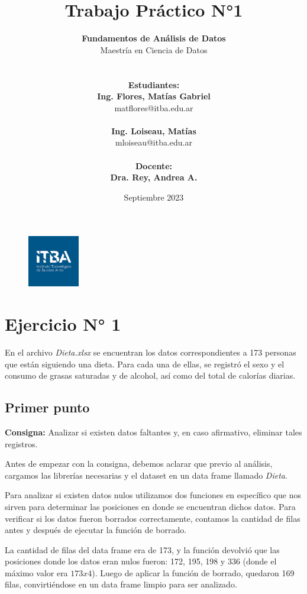 \documentclass{article} %
\title{Trabajo Práctico N°1} %
\date{Septiembre 2023} %
\author{
	\textbf{Fundamentos de Análisis de Datos}\\
	Maestría en Ciencia de Datos\\
	\\~\\
	\textbf{Estudiantes: }\\
	\textbf{Ing. Flores, Matías Gabriel}\\
	matflores@itba.edu.ar
 	\\~\\
 	\textbf{Ing. Loiseau, Matías}\\
 	mloiseau@itba.edu.ar
 	\\~\\
	\textbf{Docente: }\\
	\textbf{Dra. Rey, Andrea A.}
}
\begin{document}

\begin{figure}
\centering
	\includegraphics[width=0.2\textwidth]{images/itba-logo}
	\label{fig:itba-logo}
\end{figure}
\maketitle %

\thispagestyle{empty} %
\cleardoublepage

\cleardoublepage
\tableofcontents %
\cleardoublepage


\section{Ejercicio N° 1}

En el archivo \textit{Dieta.xlsx} se encuentran los datos correspondientes a 173 personas que están siguiendo una dieta. Para cada una de ellas, se registró el sexo y el consumo de grasas saturadas y de alcohol, así como del total de calorías diarias.

\subsection{Primer punto}

\textbf{Consigna:} Analizar si existen datos faltantes y, en caso afirmativo, eliminar tales registros.

Antes de empezar con la consigna, debemos aclarar que previo al análisis, cargamos las librerías necesarias y el dataset en un data frame llamado \textit{Dieta}.

Para analizar si existen datos nulos utilizamos dos funciones en específico 	que nos sirven para determinar las posiciones en donde se encuentran dichos datos. Para verificar si los datos fueron borrados correctamente, contamos la cantidad de filas antes y después de ejecutar la función de borrado. 

La cantidad de filas del data frame era de 173, y la función devolvió que las posiciones donde los datos eran nulos fueron: 172, 195, 198 y 336 (donde el máximo valor era $173 x 4$). Luego de aplicar la función de borrado, quedaron 169 filas, convirtiéndose en un data frame limpio para ser analizado.
\end{document}
